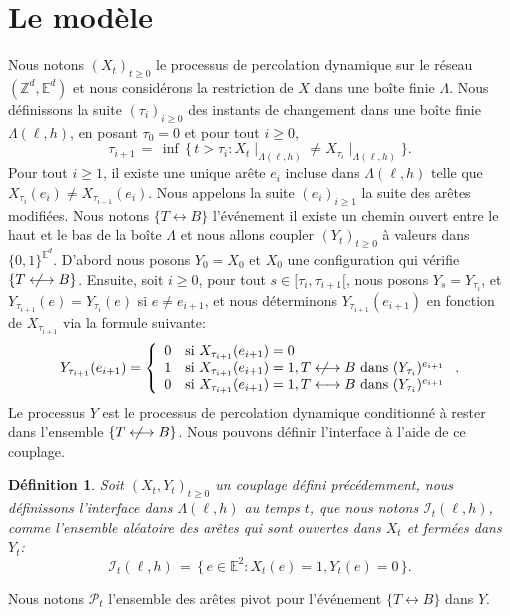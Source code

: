 \documentclass[titlepage,a4paper,12pt]{article}
\newcounter{def}
\newtheorem{defi}[def]{Définition}
\newcommand{\nlongleftrightarrow}{\longleftrightarrow \kern-15pt\not \kern15pt}
\begin{document}
\section{Le modèle}
Nous notons $(X_t)_{t\geqslant 0}$ le processus de percolation dynamique sur le réseau $(\mathbb{Z}^d,\mathbb{E}^d)$ et nous considérons la restriction de $X$ dans une boîte finie $\Lambda$. Nous définissons la suite $(\tau_i)_{i\geqslant 0}$ des instants de changement dans une boîte finie $\Lambda(\ell,h)$, en posant $\tau_0 = 0$ et pour tout $i\geqslant 0$,
$$\tau_{i+1} \,=\, \inf \,\big\{ \, t>\tau_i: {X_t}\mid_{ \Lambda(\ell,h)} \neq {X_{\tau_i}}\mid_{ \Lambda(\ell,h)} \big \}.
$$
Pour tout $i\geqslant 1$, il existe une unique arête $e_i$ incluse dans $\Lambda(\ell,h)$ telle que $X_{\tau_i}(e_i) \neq X_{\tau_{i-1}}(e_i)$. Nous appelons la suite $(e_i)_{i\geqslant 1}$ la suite des arêtes modifiées.
Nous notons $\{T\longleftrightarrow B\}$ l'événement il existe un chemin ouvert entre le haut et le bas de la boîte $\Lambda$ et nous allons coupler $(Y_t)_{t\geqslant 0}$ à valeurs dans $\{0,1\}^{\mathbb{E}^d}$. D'abord nous posons $Y_0=X_0$ et $X_0$ une configuration qui vérifie $\{T\nlongleftrightarrow B\}$. Ensuite, soit $i\geqslant 0$, pour tout $s\in [\tau_i, \tau_{i+1}[$, nous posons $Y_s = Y_{\tau_i}$, et $Y_{\tau_{i+1}}(e) =Y_{\tau_i}(e)$ si $e\neq e_{i+1}$, et nous déterminons $Y_{\tau_{i+1}}(e_{i+1})$ en fonction de $X_{\tau_{i+1}}$ via la formule suivante:
$$Y_{\tau_{i+1}}(e_{i+1})=\left\lbrace \begin{array}{cl}
0 &\text{si }X_{\tau_{i+1}}(e_{i+1}) = 0\\
1 & \text{si }X_{\tau_{i+1}}(e_{i+1}) = 1, T \nlongleftrightarrow B \text{ dans }(Y_{\tau_i})^{e_{i+1}}\\
0 & \text{si }X_{\tau_{i+1}}(e_{i+1}) = 1, T \longleftrightarrow B \text{ dans }(Y_{\tau_i})^{e_{i+1}}
\end{array}\right..$$
Le processus $Y$ est le processus de percolation dynamique conditionné à rester dans l'ensemble $\{T\nlongleftrightarrow B\}$. Nous pouvons définir l'interface à l'aide de ce couplage.
\begin{defi}
Soit $(X_t,Y_t)_{t\geqslant 0}$ un couplage défini précédemment, nous définissons l'interface dans $\Lambda({\ell,h})$ au temps $t$, que nous notons $\mathcal{I}_t({\ell,h})$, comme l'ensemble aléatoire des arêtes qui sont ouvertes dans $X_t$ et fermées dans $Y_t$: $$ \mathcal{I}_t({\ell,h}) \,=\, \big\{ \,e\in \mathbb{E}^2: X_t(e) = 1, Y_t(e) = 0 \, \big\}.
$$
\end{defi}
Nous notons $\mathcal{P}_t$ l'ensemble des arêtes pivot pour l'événement $\{T\longleftrightarrow B\}$ dans $Y$.
\end{document}
